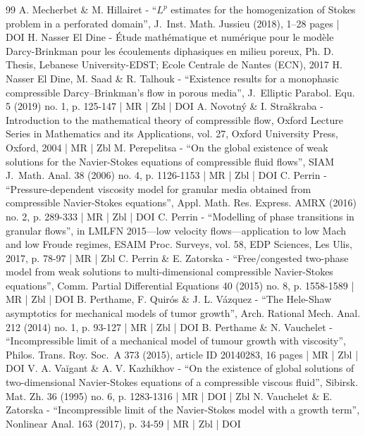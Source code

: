 \begin{thebibliography}{99}
A. Mecherbet \& M. Hillairet - “$L^{p}$ estimates for the homogenization of Stokes problem in a perforated domain”, J. Inst. Math. Jussieu (2018), 1–28 pages | DOI
H. Nasser El Dine - Étude mathématique et numérique pour le modèle Darcy-Brinkman pour les écoulements diphasiques en milieu poreux, Ph. D. Thesis, Lebanese University-EDST; Ecole Centrale de Nantes (ECN), 2017
H. Nasser El Dine, M. Saad \& R. Talhouk - “Existence results for a monophasic compressible Darcy–Brinkman’s flow in porous media”, J. Elliptic Parabol. Equ. 5 (2019) no. 1, p. 125-147 | MR | Zbl | DOI
A. Novotný \& I. Straškraba - Introduction to the mathematical theory of compressible flow, Oxford Lecture Series in Mathematics and its Applications, vol. 27, Oxford University Press, Oxford, 2004 | MR | Zbl
M. Perepelitsa - “On the global existence of weak solutions for the Navier-Stokes equations of compressible fluid flows”, SIAM J. Math. Anal. 38 (2006) no. 4, p. 1126-1153 | MR | Zbl | DOI
C. Perrin - “Pressure-dependent viscosity model for granular media obtained from compressible Navier-Stokes equations”, Appl. Math. Res. Express. AMRX (2016) no. 2, p. 289-333 | MR | Zbl | DOI
C. Perrin - “Modelling of phase transitions in granular flows”, in LMLFN 2015—low velocity flows—application to low Mach and low Froude regimes, ESAIM Proc. Surveys, vol. 58, EDP Sciences, Les Ulis, 2017, p. 78-97 | MR | Zbl
C. Perrin \& E. Zatorska - “Free/congested two-phase model from weak solutions to multi-dimensional compressible Navier-Stokes equations”, Comm. Partial Differential Equations 40 (2015) no. 8, p. 1558-1589 | MR | Zbl | DOI
B. Perthame, F. Quirós \& J. L. Vázquez - “The Hele-Shaw asymptotics for mechanical models of tumor growth”, Arch. Rational Mech. Anal. 212 (2014) no. 1, p. 93-127 | MR | Zbl | DOI
B. Perthame \& N. Vauchelet - “Incompressible limit of a mechanical model of tumour growth with viscosity”, Philos. Trans. Roy. Soc. A 373 (2015), article ID 20140283, 16 pages | MR | Zbl | DOI
V. A. Vaĭgant \& A. V. Kazhikhov - “On the existence of global solutions of two-dimensional Navier-Stokes equations of a compressible viscous fluid”, Sibirsk. Mat. Zh. 36 (1995) no. 6, p. 1283-1316 | MR | DOI | Zbl
N. Vauchelet \& E. Zatorska - “Incompressible limit of the Navier-Stokes model with a growth term”, Nonlinear Anal. 163 (2017), p. 34-59 | MR | Zbl | DOI
\end{thebibliography}

